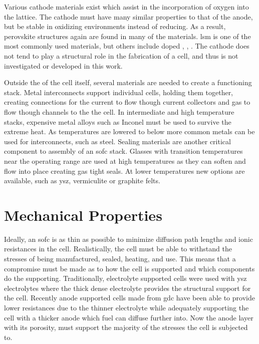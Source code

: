     Various cathode materials exist which assist in the incorporation of oxygen into the lattice.
    The cathode must have many similar properties to that of the anode, but be stable in oxidizing environments instead of reducing.
    As a result, perovskite structures again are found in many of the materials.
    \Gls{lsm} is one of the most commonly used materials, but others include doped , , . \cite{Minh2004, Cascos2016, Chen2015, Kuhn2013}
    The cathode does not tend to play a structural role in the fabrication of a cell, and thus is not investigated or developed in this work.

    Outside the of the cell itself, several materials are needed to create a functioning stack.
    Metal interconnects support individual cells, holding them together, creating connections for the current to flow though current collectors and gas to flow though channels to the the cell.
    In intermediate and high temperature stacks, expensive metal alloys such as Inconel must be used to survive the extreme heat.
    As temperatures are lowered to below  more common metals can be used for interconnects, such as steel.
    Sealing materials are another critical component to assembly of an \gls{sofc} stack.
    Glasses with transition temperatures near the operating range are used at high temperatures as they can soften and flow into place creating gas tight seals.
    At lower temperatures new options are available, such as \gls{ysz}, vermiculite or graphite felts.%

\section{Mechanical Properties}
    Ideally, an \gls{sofc} is as thin as possible to minimize diffusion path lengths and ionic resistances in the cell.\cite{Chan2001}
    Realistically, the cell must be able to withstand the stresses of being manufactured, sealed, heating, and use.
    This means that a compromise must be made as to how the cell is supported and which components do the supporting.
    Traditionally, electrolyte supported cells were used with \gls{ysz} electrolytes where the thick dense electrolyte provides the structural support for the cell.
    Recently anode supported cells made from \gls{gdc} have been able to provide lower resistances due to the thinner electrolyte while adequately supporting the cell with a thicker anode which fuel can diffuse further into.\cite{Fleischhauer2014a,Laurencin2008}
    Now the anode layer with its porosity, must support the majority of the stresses the cell is subjected to.

